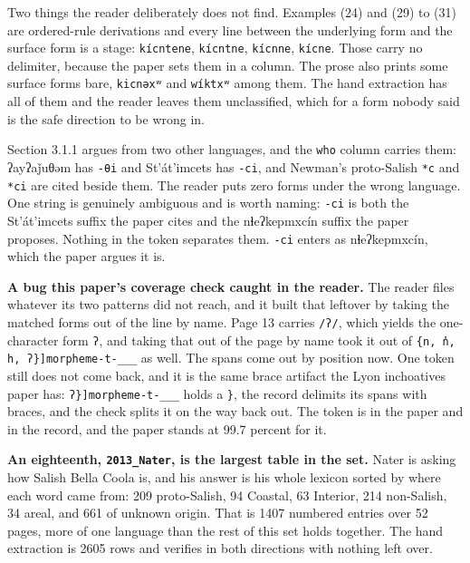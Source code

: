 Two things the reader deliberately does not find. Examples (24) and (29) to (31) are ordered-rule derivations and every line between the underlying form and the surface form is a stage: \texttt{kícntene}, \texttt{kícntne}, \texttt{kícnne}, \texttt{kícne}. Those carry no delimiter, because the paper sets them in a column. The prose also prints some surface forms bare, \texttt{kicnəxʷ} and \texttt{wíktxʷ} among them. The hand extraction has all of them and the reader leaves them unclassified, which for a form nobody said is the safe direction to be wrong in.

Section 3.1.1 argues from two other languages, and the \texttt{who} column carries them: ʔayʔaǰuθəm has \texttt{-\allowbreak{}θi} and St'át'imcets has \texttt{-\allowbreak{}ci}, and Newman's proto-Salish \texttt{*c} and \texttt{*ci} are cited beside them. The reader puts zero forms under the wrong language. One string is genuinely ambiguous and is worth naming: \texttt{-\allowbreak{}ci} is both the St'át'imcets suffix the paper cites and the nɬeʔkepmxcín suffix the paper proposes. Nothing in the token separates them. \texttt{-\allowbreak{}ci} enters as nɬeʔkepmxcín, which the paper argues it is.

\textbf{A bug this paper's coverage check caught in the reader.} The reader files whatever its two patterns did not reach, and it built that leftover by taking the matched forms out of the line by name. Page 13 carries \texttt{/\allowbreak{}ʔ/\allowbreak{}}, which yields the one-character form \texttt{ʔ}, and taking that out of the page by name took it out of \texttt{\{n, n̓, h, ʔ\}]morpheme-\allowbreak{}t-\allowbreak{}\_\allowbreak{}\_\allowbreak{}\_\allowbreak{}} as well. The spans come out by position now. One token still does not come back, and it is the same brace artifact the Lyon inchoatives paper has: \texttt{ʔ\}]morpheme-\allowbreak{}t-\allowbreak{}\_\allowbreak{}\_\allowbreak{}\_\allowbreak{}} holds a \texttt{\}}, the record delimits its spans with braces, and the check splits it on the way back out. The token is in the paper and in the record, and the paper stands at 99.7 percent for it.

\textbf{An eighteenth, \texttt{2013\_\allowbreak{}Nater}, is the largest table in the set.} Nater is asking how Salish Bella Coola is, and his answer is his whole lexicon sorted by where each word came from: 209 proto-Salish, 94 Coastal, 63 Interior, 214 non-Salish, 34 areal, and 661 of unknown origin. That is 1407 numbered entries over 52 pages, more of one language than the rest of this set holds together. The hand extraction is 2605 rows and verifies in both directions with nothing left over.

